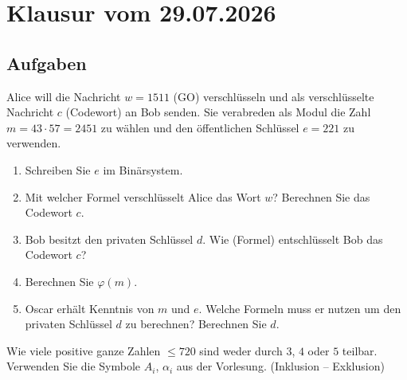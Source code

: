 \section{Klausur vom 29.07.2026}

\subsection{Aufgaben}

\begin{aufgabe}[Aufgabe 1]
Alice will die Nachricht $w = 1511$ (GO) verschlüsseln und als verschlüsselte Nachricht $c$ (Codewort) an Bob senden. Sie verabreden als Modul die Zahl $m = 43 \cdot 57 = 2451$ zu wählen und den öffentlichen Schlüssel $e = 221$ zu verwenden.
\begin{enumerate}[label=\alph*)]
  \item Schreiben Sie $e$ im Binärsystem.
  \item Mit welcher Formel verschlüsselt Alice das Wort $w$? Berechnen Sie das Codewort $c$.
  \item Bob besitzt den privaten Schlüssel $d$. Wie (Formel) entschlüsselt Bob das Codewort $c$?
  \item Berechnen Sie $\varphi(m)$.
  \item Oscar erhält Kenntnis von $m$ und $e$. Welche Formeln muss er nutzen um den privaten Schlüssel $d$ zu berechnen? Berechnen Sie $d$.
\end{enumerate}
\end{aufgabe}

\begin{aufgabe}[Aufgabe 2]
Wie viele positive ganze Zahlen $\leq 720$ sind weder durch $3$, $4$ oder $5$ teilbar. Verwenden Sie die Symbole $A_i$, $\alpha_i$ aus der Vorlesung. (Inklusion -- Exklusion)
\end{aufgabe}

